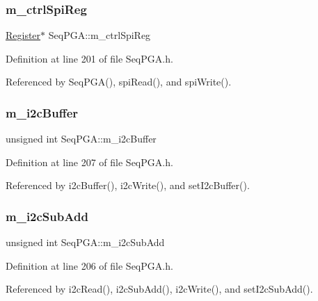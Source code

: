 \subsubsection{\texorpdfstring{m\+\_\+ctrl\+Spi\+Reg}{m\_ctrlSpiReg}}
{\footnotesize\ttfamily \hyperlink{classRegister}{Register}$\ast$ Seq\+P\+G\+A\+::m\+\_\+ctrl\+Spi\+Reg\hspace{0.3cm}{\ttfamily [private]}}



Definition at line 201 of file Seq\+P\+G\+A.\+h.



Referenced by Seq\+P\+G\+A(), spi\+Read(), and spi\+Write().

\mbox{\label{classSeqPGA_afcef519379e9c6ba624ba58a4eac79f1}} 
\subsubsection{\texorpdfstring{m\+\_\+i2c\+Buffer}{m\_i2cBuffer}}
{\footnotesize\ttfamily unsigned int Seq\+P\+G\+A\+::m\+\_\+i2c\+Buffer\hspace{0.3cm}{\ttfamily [private]}}



Definition at line 207 of file Seq\+P\+G\+A.\+h.



Referenced by i2c\+Buffer(), i2c\+Write(), and set\+I2c\+Buffer().

\mbox{\label{classSeqPGA_a82bda98edb9681aff47733e83ac8bc4f}} 
\subsubsection{\texorpdfstring{m\+\_\+i2c\+Sub\+Add}{m\_i2cSubAdd}}
{\footnotesize\ttfamily unsigned int Seq\+P\+G\+A\+::m\+\_\+i2c\+Sub\+Add\hspace{0.3cm}{\ttfamily [private]}}



Definition at line 206 of file Seq\+P\+G\+A.\+h.



Referenced by i2c\+Read(), i2c\+Sub\+Add(), i2c\+Write(), and set\+I2c\+Sub\+Add().

